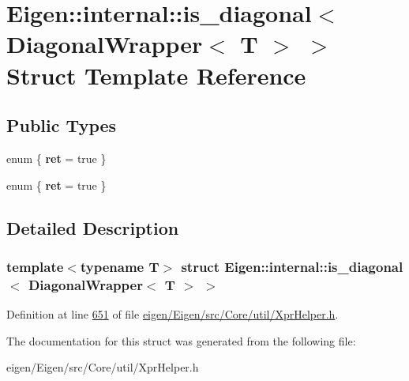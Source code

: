 \hypertarget{struct_eigen_1_1internal_1_1is__diagonal_3_01_diagonal_wrapper_3_01_t_01_4_01_4}{}\section{Eigen\+:\+:internal\+:\+:is\+\_\+diagonal$<$ Diagonal\+Wrapper$<$ T $>$ $>$ Struct Template Reference}
\label{struct_eigen_1_1internal_1_1is__diagonal_3_01_diagonal_wrapper_3_01_t_01_4_01_4}
\subsection*{Public Types}
\begin{DoxyCompactItemize}
\item 
\mbox{\label{struct_eigen_1_1internal_1_1is__diagonal_3_01_diagonal_wrapper_3_01_t_01_4_01_4_a4a7c8e38da074de07cc1ec0a64d3c1f7}} 
enum \{ {\bfseries ret} = true
 \}
\item 
\mbox{\label{struct_eigen_1_1internal_1_1is__diagonal_3_01_diagonal_wrapper_3_01_t_01_4_01_4_a82213746fdfbe99bab00486f20f3fee8}} 
enum \{ {\bfseries ret} = true
 \}
\end{DoxyCompactItemize}


\subsection{Detailed Description}
\subsubsection*{template$<$typename T$>$\newline
struct Eigen\+::internal\+::is\+\_\+diagonal$<$ Diagonal\+Wrapper$<$ T $>$ $>$}



Definition at line \hyperlink{eigen_2_eigen_2src_2_core_2util_2_xpr_helper_8h_source_l00651}{651} of file \hyperlink{eigen_2_eigen_2src_2_core_2util_2_xpr_helper_8h_source}{eigen/\+Eigen/src/\+Core/util/\+Xpr\+Helper.\+h}.



The documentation for this struct was generated from the following file\+:\begin{DoxyCompactItemize}
\item 
eigen/\+Eigen/src/\+Core/util/\+Xpr\+Helper.\+h\end{DoxyCompactItemize}
